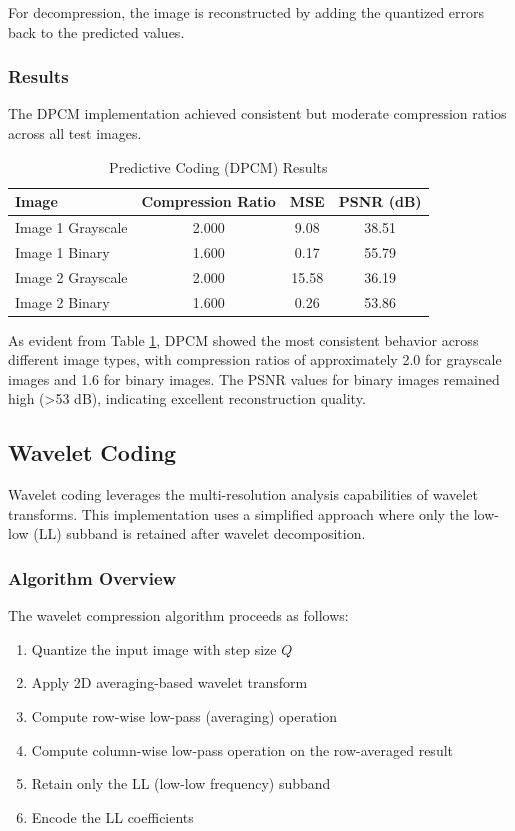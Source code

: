 \documentclass[12pt, a4paper]{AnantDocumentation}
\begin{document}
For decompression, the image is reconstructed by adding the quantized errors back to the predicted values.

\subsubsection{Results}
The DPCM implementation achieved consistent but moderate compression ratios across all test images.

\begin{table}[h!]
	\centering
	\begin{tabular}{lccc}
		\toprule
		Image & Compression Ratio & MSE & PSNR (dB) \\
		\midrule
		Image 1 Grayscale & 2.000 & 9.08 & 38.51 \\
		Image 1 Binary & 1.600 & 0.17 & 55.79 \\
		Image 2 Grayscale & 2.000 & 15.58 & 36.19 \\
		Image 2 Binary & 1.600 & 0.26 & 53.86 \\
		\bottomrule
	\end{tabular}
	\caption{Predictive Coding (DPCM) Results}
	\label{tab:dpcm-results}
\end{table}

As evident from Table \ref{tab:dpcm-results}, DPCM showed the most consistent behavior across different image types, with compression ratios of approximately 2.0 for grayscale images and 1.6 for binary images. The PSNR values for binary images remained high (>53 dB), indicating excellent reconstruction quality.

\subsection{Wavelet Coding}
\label{subsec:wavelet-coding}
Wavelet coding leverages the multi-resolution analysis capabilities of wavelet transforms. This implementation uses a simplified approach where only the low-low (LL) subband is retained after wavelet decomposition.

\subsubsection{Algorithm Overview}
The wavelet compression algorithm proceeds as follows:
\begin{enumerate}
	\item Quantize the input image with step size $Q$
	\item Apply 2D averaging-based wavelet transform
	\item Compute row-wise low-pass (averaging) operation
	\item Compute column-wise low-pass operation on the row-averaged result
	\item Retain only the LL (low-low frequency) subband
	\item Encode the LL coefficients
\end{enumerate}
\end{document}
